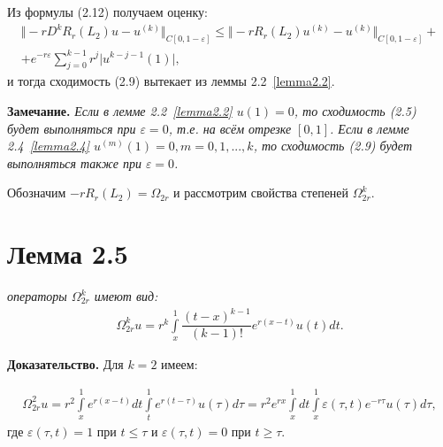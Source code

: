 Из формулы (2.12) получаем оценку:
\begin{equation}
\begin{array}{c}
\nonumber

\Vert -rD^kR_r(L_2)u - u^{(k)} \Vert_{C[0,1-\varepsilon]} \leq \Vert -rR_r(L_2)u^{(k)} - u^{(k)} \Vert_{C[0,1-\varepsilon]} + \\ + e^{-r\varepsilon}\sum\limits_{j=0}^{k-1} r^j\vert u^{k-j-1}(1)\vert ,

\end{array}
\end{equation}
и тогда сходимость (2.9) вытекает из леммы 2.2~\eqref{lemma2.2}.

\textbf{Замечание.} \textit{Если в лемме 2.2~\eqref{lemma2.2} $ u(1) = 0 $, то сходимость (2.5) будет выполняться при $ \varepsilon = 0 $, т.е. на всём отрезке $ [0,1] $. Если в лемме 2.4~\eqref{lemma2.4} $ u^{(m)}(1) = 0, m = 0,1,...,k $, то сходимость (2.9) будет выполняться также при $ \varepsilon = 0 $.}

Обозначим $ -rR_r(L_2) = \Omega_{2r} $ и рассмотрим свойства степеней $ \Omega_{2r}^k $.

\section{Лемма 2.5}
\label{lemma2.5}
\textit{операторы $ \Omega_{2r}^k $ имеют вид:}
\begin{equation}
\begin{array}{c}

\Omega_{2r}^ku = r^k\int\limits_x^1 \dfrac{(t-x)^{k-1}}{(k-1)!}e^{r(x-t)}u(t)dt.

\end{array}
\end{equation}

\textbf{Доказательство.} Для $ k = 2 $ имеем:

\begin{equation}
\begin{array}{c}
\nonumber

\Omega_{2r}^2u = r^2\int\limits_x^1 e^{r(x-t)}dt\int\limits_t^1 e^{r(t-\tau)}u(\tau)d\tau = r^2e^{rx} \int\limits_x^1 dt \int\limits_x^1 \varepsilon (\tau ,t)e^{-r\tau}u(\tau)d\tau ,

\end{array}
\end{equation}
где $ \varepsilon (\tau ,t) = 1 $ при $ t \leq \tau $ и $ \varepsilon (\tau ,t) = 0 $ при $ t \geq \tau $.

